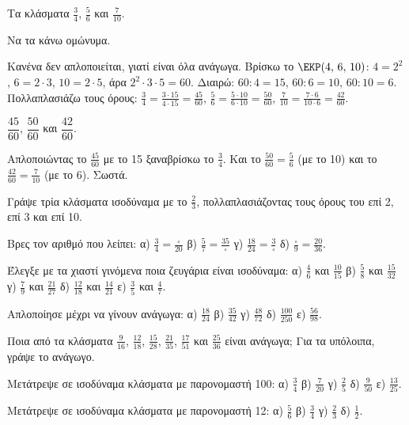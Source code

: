 \tixero Τα κλάσματα $\frac{3}{4}$, $\frac{5}{6}$ και $\frac{7}{10}$.\par
\tithelo Να τα κάνω ομώνυμα.\par
\possindeo Κανένα δεν απλοποιείται, γιατί είναι όλα ανάγωγα. Βρίσκω το $\EKP(4,\,6,\,10)$: $4=2^2$, $6=2\cdot 3$, $10=2\cdot 5$, άρα $2^2\cdot 3\cdot 5=60$. Διαιρώ: $60:4=15$, $60:6=10$, $60:10=6$. Πολλαπλασιάζω τους όρους: $\frac{3}{4}=\frac{3\cdot 15}{4\cdot 15}=\frac{45}{60}$, $\frac{5}{6}=\frac{5\cdot 10}{6\cdot 10}=\frac{50}{60}$, $\frac{7}{10}=\frac{7\cdot 6}{10\cdot 6}=\frac{42}{60}$.\par
\apantisi $\dfrac{45}{60}$, $\dfrac{50}{60}$ και $\dfrac{42}{60}$.\par
\elegxos Απλοποιώντας το $\frac{45}{60}$ με το 15 ξαναβρίσκω το $\frac{3}{4}$. Και το $\frac{50}{60}=\frac{5}{6}$ (με το 10) και το $\frac{42}{60}=\frac{7}{10}$ (με το 6). Σωστά.



\ex Γράψε τρία κλάσματα ισοδύναμα με το $\frac{2}{3}$, πολλαπλασιάζοντας τους όρους του επί 2, επί 3 και επί 10.

\ex Βρες τον αριθμό που λείπει: α) $\frac{3}{4}=\frac{\square}{20}$ \quad β) $\frac{5}{7}=\frac{35}{\square}$ \quad γ) $\frac{18}{24}=\frac{3}{\square}$ \quad δ) $\frac{\square}{9}=\frac{20}{36}$.

\ex Έλεγξε με τα χιαστί γινόμενα ποια ζευγάρια είναι ισοδύναμα: α) $\frac{4}{6}$ και $\frac{10}{15}$ \quad β) $\frac{5}{8}$ και $\frac{15}{32}$ \quad γ) $\frac{7}{9}$ και $\frac{21}{27}$ \quad δ) $\frac{12}{18}$ και $\frac{14}{21}$ \quad ε) $\frac{3}{5}$ και $\frac{4}{7}$.

\ex Απλοποίησε μέχρι να γίνουν ανάγωγα: α) $\frac{18}{24}$ \quad β) $\frac{35}{42}$ \quad γ) $\frac{48}{72}$ \quad δ) $\frac{100}{250}$ \quad ε) $\frac{56}{98}$.

\ex Ποια από τα κλάσματα $\frac{9}{16}$, $\frac{12}{18}$, $\frac{15}{28}$, $\frac{21}{35}$, $\frac{17}{51}$ και $\frac{25}{36}$ είναι ανάγωγα; Για τα υπόλοιπα, γράψε το ανάγωγο.

\ex Μετάτρεψε σε ισοδύναμα κλάσματα με παρονομαστή 100: α) $\frac{3}{4}$ \quad β) $\frac{7}{20}$ \quad γ) $\frac{2}{5}$ \quad δ) $\frac{9}{50}$ \quad ε) $\frac{13}{25}$.

\ex Μετάτρεψε σε ισοδύναμα κλάσματα με παρονομαστή 12: α) $\frac{5}{6}$ \quad β) $\frac{3}{4}$ \quad γ) $\frac{2}{3}$ \quad δ) $\frac{1}{2}$.

